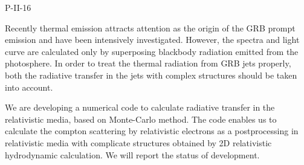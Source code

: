 P-II-16


\bigskip



\bigskip

\noindent Recently thermal emission attracts attention as the origin of the GRB prompt emission and have been intensively investigated. However, the spectra and light curve are calculated only by superposing blackbody radiation emitted from the photosphere. In order to treat the thermal radiation from GRB jets properly, both the radiative transfer in the jets with complex structures should be taken into account.

We are developing a numerical code to calculate radiative transfer in the relativistic media, based on Monte-Carlo method. The code enables us to calculate the compton scattering by relativistic electrons as a postprocessing in relativistic media with complicate structures obtained by 2D relativistic hydrodynamic calculation. We will report the status of development.

